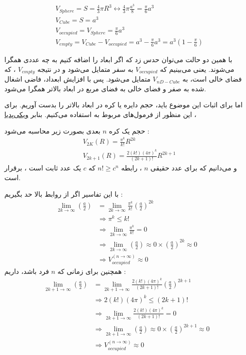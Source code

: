 \documentclass[a4paper, 12pt]{article}
\begin{document}
\begin{align*}
	&V_{Sphere}= S = \frac{4}{3}\pi R^3 \longleftrightarrow \frac{4}{3}\pi \frac{a^3}{8} = \frac{\pi}{6} a^3\\
	&V_{Cube} = S = a^3 \\
	&V_{occupied} = V_{Sphere} = \frac{\pi}{6} a^3 \\
	&V_{empty} = V_{Cube} - V_{occupied} = a^3 - \frac{\pi}{6} a^3 = a^3 (1 - \frac{\pi}{6})
\end{align*}

با همین دو حالت می‌توان حدس زد که اگر ابعاد را اضافه کنیم به چه عددی همگرا می‌شوند. یعنی می‌بینیم که 
$V_{occupied}$
به سفر متمایل می‌شود و در نتیجه 
$V_{empty}$
، که فضای خالی است، به 
$V_{nD-Cube}$
متمایل می‌شود.  پس با افزایش ابعداد، فاضی اشغال شده به صفر و فضای خالی به فضای مربع در ابعاد بالاتر همگرا می‌شود. 

اما برای اثبات این موضوع باید، حجم دایره یا کره در ابعاد بالاتر را بدست آوریم. برای این منظور از فرمول‌های مربوط به 
استفاده می‌کنیم. بنابر
\href{https://en.wikipedia.org/wiki/Volume_of_an_n-ball}{ویکی‌پدیا}
،

حجم یک کره $n$ بعدی بصورت زیر محاسبه می‌شود :
\begin{align*}
	&V_{2K}(R) = \frac{\pi^k}{k!}R^{2k}\\
	&V_{2k+1}(R) = \frac{2 (k!)(4\pi)^k}{(2k + 1)!}R^{2k+1}
\end{align*}
و می‌دانیم که برای عدد حقیقی 
$n$
، رابطه 
$n! \geq c^n$
که 
$c$
یک عدد ثابت است ، برقرار است. 

با این تفاسیر اگر از روابط بالا حد بگیریم :
\begin{align*}
	\lim\limits_{2k \rightarrow \infty}(\frac{a}{2}) &= 	\lim\limits_{2k \rightarrow \infty}\frac{\pi^k}{k!} (\frac{a}{2})^{2k}\\
	&\Rightarrow \pi^k \leq k!\\
	& \Rightarrow \lim\limits_{2k \rightarrow \infty} \frac{\pi^k}{k!} = 0 \\
	 &\Rightarrow 	\lim\limits_{2k \rightarrow \infty}(\frac{a}{2}) \approx 0 \times (\frac{a}{2})^{2k} \approx 0\\
	& \Rightarrow V_{occupied}^{(n\rightarrow \infty)} \approx 0    
\end{align*}
همچنین برای زمانی که 
$n$
فرد باشد، داریم :
\begin{align*}
	\lim\limits_{2k+1 \rightarrow \infty}(\frac{a}{2}) &= 	\lim\limits_{2k+1 \rightarrow \infty}\frac{2 (k!)(4\pi)^k}{(2k+1)!} (\frac{a}{2})^{2k+1}\\
	&\Rightarrow 2 (k!)(4\pi)^k \leq (2k + 1)!\\
	& \Rightarrow \lim\limits_{2k+1 \rightarrow \infty} \frac{2 (k!)(4\pi)^k}{(2k+1)!} = 0 \\
	&\Rightarrow 	\lim\limits_{2k+1 \rightarrow \infty}(\frac{a}{2}) \approx 0 \times (\frac{a}{2})^{2k+1} \approx 0\\
	& \Rightarrow V_{occupied}^{(n\rightarrow \infty)} \approx 0 
\end{align*}
\end{document}
